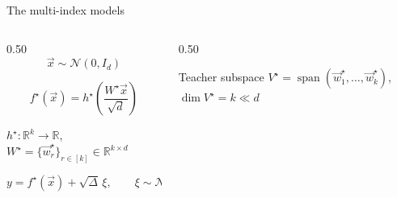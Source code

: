 \documentclass[aspectratio=169,11pt]{beamer}
\begin{document}
\begin{frame}{The multi-index models}
  \begin{columns}[T]
    \begin{column}{0.50\textwidth}
      \vspace{-0.4em}
      \[ \vec{x} \sim \mathcal{N}(0, I_d) \]

      \vspace{-0.4em}
      \[ f^\star(\vec{x}) = h^\star\!\left(\frac{W^\star \vec{x}}{\sqrt{d}}\right) \]
      \vspace{-1.0em}
      \begin{center}
        \small
        $h^\star : \mathbb{R}^k \to \mathbb{R}$,\qquad
        $W^\star = \{\vec{w}^\star_r\}_{r \in [k]} \in \mathbb{R}^{k \times d}$
      \end{center}
      \vspace{0.2em}

      \[
        y = f^\star(\vec{x}) + \sqrt{\Delta}\,\xi,
        \qquad \xi \sim \mathcal{N}(0,1)
      \]
    \end{column}
    \begin{column}{0.50\textwidth}
      \centering
      \vspace{-1.0em}
      \begin{defbox}{Teacher subspace}
        \centering
        $V^\star = \operatorname{span}(\vec{w}^\star_1, \ldots, \vec{w}^\star_k)$,
        \qquad $\dim V^\star = k \ll d$
        \vspace{0.15em}


\end{defbox}
\end{column}
\end{columns}
\end{frame}
\end{document}
